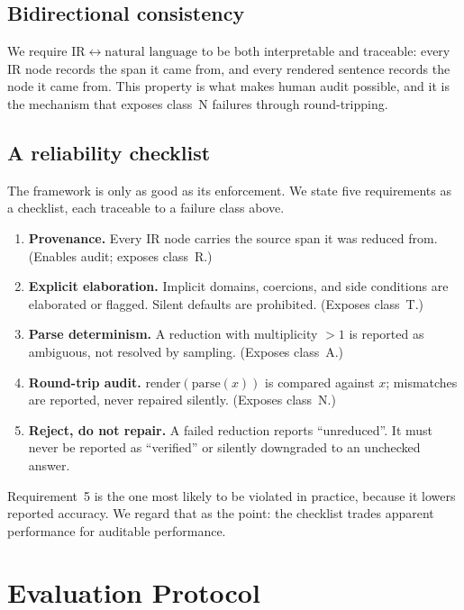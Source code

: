 \documentclass[11pt,a4paper]{article}
\begin{document}
\subsection{Bidirectional consistency}
We require $\mathrm{IR} \leftrightarrow \text{natural language}$ to be both
interpretable and traceable: every IR node records the span it came from, and
every rendered sentence records the node it came from.  This property is what
makes human audit possible, and it is the mechanism that exposes class~N
failures through round-tripping.

\subsection{A reliability checklist}
The framework is only as good as its enforcement.  We state five requirements
as a checklist, each traceable to a failure class above.

\begin{enumerate}
  \item \textbf{Provenance.}  Every IR node carries the source span it was
        reduced from.  (Enables audit; exposes class~R.)
  \item \textbf{Explicit elaboration.}  Implicit domains, coercions, and side
        conditions are elaborated or flagged.  Silent defaults are prohibited.
        (Exposes class~T.)
  \item \textbf{Parse determinism.}  A reduction with multiplicity $>1$ is
        reported as ambiguous, not resolved by sampling.  (Exposes class~A.)
  \item \textbf{Round-trip audit.}  $\mathrm{render}(\mathrm{parse}(x))$ is
        compared against $x$; mismatches are reported, never repaired silently.
        (Exposes class~N.)
  \item \textbf{Reject, do not repair.}  A failed reduction reports
        ``unreduced''.  It must never be reported as ``verified'' or silently
        downgraded to an unchecked answer.
\end{enumerate}

Requirement~5 is the one most likely to be violated in practice, because it
lowers reported accuracy.  We regard that as the point: the checklist trades
apparent performance for auditable performance.

\section{Evaluation Protocol}
\label{sec:protocol}
\end{document}
